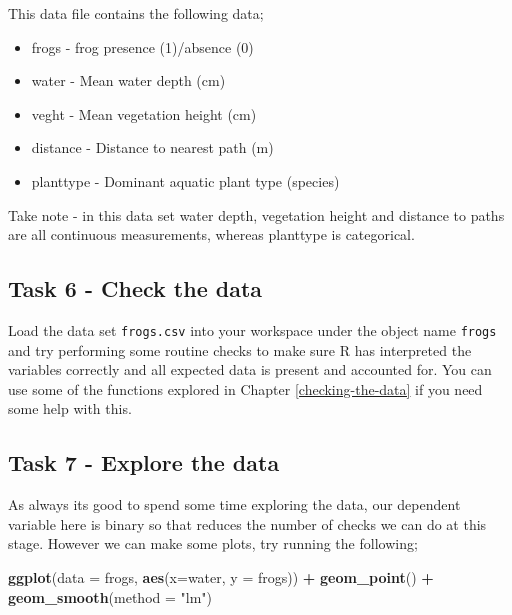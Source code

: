 \documentclass[
]{book}
\newenvironment{Shaded}{\begin{snugshade}}{\end{snugshade}}
\newcommand{\AttributeTok}[1]{\textcolor[rgb]{0.13,0.29,0.53}{#1}}
\newcommand{\FunctionTok}[1]{\textcolor[rgb]{0.13,0.29,0.53}{\textbf{#1}}}
\newcommand{\NormalTok}[1]{#1}
\newcommand{\SpecialCharTok}[1]{\textcolor[rgb]{0.81,0.36,0.00}{\textbf{#1}}}
\newcommand{\StringTok}[1]{\textcolor[rgb]{0.31,0.60,0.02}{#1}}
\providecommand{\tightlist}{%
  \setlength{\itemsep}{0pt}\setlength{\parskip}{0pt}}
\begin{document}
This data file contains the following data;

\begin{itemize}
\tightlist
\item
  frogs - frog presence (1)/absence (0)
\item
  water - Mean water depth (cm)
\item
  veght - Mean vegetation height (cm)
\item
  distance - Distance to nearest path (m)
\item
  planttype - Dominant aquatic plant type (species)
\end{itemize}

Take note - in this data set water depth, vegetation height and distance to paths are all continuous measurements, whereas planttype is categorical.

\hypertarget{task-6---check-the-data}{%
\subsection{Task 6 - Check the data}\label{task-6---check-the-data}}

Load the data set \texttt{frogs.csv} into your workspace under the object name \texttt{frogs} and try performing some routine checks to make sure R has interpreted the variables correctly and all expected data is present and accounted for. You can use some of the functions explored in Chapter \ref{checking-the-data} if you need some help with this.

\hypertarget{task-7---explore-the-data}{%
\subsection{Task 7 - Explore the data}\label{task-7---explore-the-data}}

As always its good to spend some time exploring the data, our dependent variable here is binary so that reduces the number of checks we can do at this stage. However we can make some plots, try running the following;

\begin{Shaded}
\begin{Highlighting}[]
\FunctionTok{ggplot}\NormalTok{(}\AttributeTok{data =}\NormalTok{ frogs, }\FunctionTok{aes}\NormalTok{(}\AttributeTok{x=}\NormalTok{water, }\AttributeTok{y =}\NormalTok{ frogs)) }\SpecialCharTok{+}
  \FunctionTok{geom\_point}\NormalTok{() }\SpecialCharTok{+}
  \FunctionTok{geom\_smooth}\NormalTok{(}\AttributeTok{method =} \StringTok{"lm"}\NormalTok{)}
\end{Highlighting}
\end{Shaded}
\end{document}
